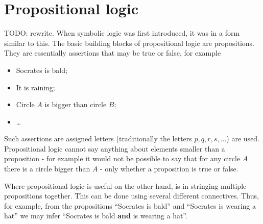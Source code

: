 \chapter{Propositional logic}
TODO: rewrite.
When symbolic logic was first introduced, it was in a form similar to this. The basic building blocks of propositional logic are propositions. They are essentially assertions that may be true or false, for example
\begin{itemize}
\item Socrates is bald;
\item It is raining;
\item Circle $A$ is bigger than circle $B$;
\item \ldots
\end{itemize}

Such assertions are assigned letters (traditionally the letters $p,q,r,s, \ldots$) are used. Propositional logic cannot say anything about elements smaller than a proposition - for example it would not be possible to say that for any circle $A$ there is a circle bigger than $A$ - only whether a proposition is true or false.

Where propositional logic is useful on the other hand, is in stringing multiple propositions together. This can be done using several different connectives. Thus, for example, from the propositions ``Socrates is bald'' and ``Socrates is wearing a hat'' we may infer ``Socrates is bald \textbf{and} is wearing a hat''.

